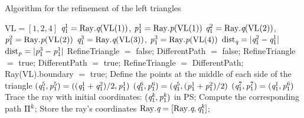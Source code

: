 \begin{algorithm}[h]
\caption{Algorithm for the refinement of the left triangles}\label{alg:left_triangle}
\begin{algorithmic}[1]
\State $\textrm{VL}= [1,2,4]$
\State $\textit{q}_1^1= \textrm{Ray}.\textit{q}(\textrm{VL}(1))$, $\textit{p}_1^1= \textrm{Ray}.\textit{p}(\textrm{VL}(1))$
\State $\textit{q}_1^2= \textrm{Ray}.\textit{q}(\textrm{VL}(2))$, $\textit{p}_1^2= \textrm{Ray}.\textit{p}(\textrm{VL}(2))$
\State $\textit{q}_1^3= \textrm{Ray}.\textit{q}(\textrm{VL}(3))$, $\textit{p}_1^3= \textrm{Ray}.\textit{p}(\textrm{VL}(4))$
\State $\textrm{dist}_{\textit{q}}= \mbox{$|\textit{q}_1^2-\textit{q}_1^1|$}$
\State $\textrm{dist}_{\textit{p}}= \mbox{$|\textit{p}_1^{3}-\textit{p}_1^1|$}$
\State RefineTriangle $=$  false;
\State DifferentPath $=$  false;
\State RefineTriangle $=$  true;
\EndIf
{}
\State DifferentPath $=$  true;
\EndIf
\EndFor
{}
\State RefineTriangle $=$  DifferentPath;
\Else
{}
\State \textrm{Ray}(\textrm{VL}).boundary $=$ true; 
\EndIf
\EndIf
{}
\State Define the points at the middle of each side of the triangle
\State $(\textit{q}_1^5, \textit{p}_1^5) = ((\textit{q}_1^1+\textit{q}_1^2)/2, \textit{p}_1^1)$
\State $(\textit{q}_1^6, \textit{p}_1^6) = (\textit{q}_1^5, (\textit{p}_1^1+\textit{p}_1^2)/2)$
\State $(\textit{q}_1^7, \textit{p}_1^7) = (\textit{q}_1^1, \textit{p}_1^6)$
\State Trace the ray with initial coordinates: $(\textit{q}_1^{\textit{k}}, \textit{p}_1^{\textit{k}})$ in PS;
\State Compute the corresponding path $\Pi^{\textit{k}}$;
\State Store the ray's coordinates $\mbox{\textrm{Ray}}.\textit{q}= [\mbox{Ray}.\textit{q}, \textit{q}_1^{\textit{k}}]$;

\end{algorithmic}
\end{algorithm}
